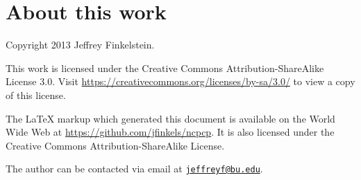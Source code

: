 \documentclass{article}
\newcommand{\email}[1]{\href{mailto:#1}{\nolinkurl{#1}}}
\begin{document}
\section{About this work}

Copyright 2013 Jef{}frey Finkelstein.

This work is licensed under the Creative Commons Attribution-ShareAlike License 3.0.
Visit \mbox{\url{https://creativecommons.org/licenses/by-sa/3.0/}} to view a copy of this license.

The \LaTeX{} markup which generated this document is available on the World Wide Web at \mbox{\url{https://github.com/jfinkels/ncpcp}}.
It is also licensed under the Creative Commons Attribution-ShareAlike License.

The author can be contacted via email at \email{jeffreyf@bu.edu}.



\end{document}
